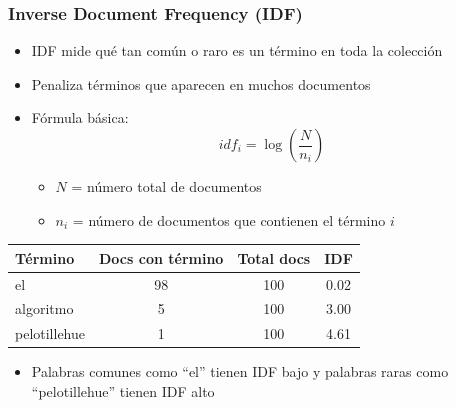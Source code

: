 \documentclass[handout]{beamer}
\begin{document}
\begin{frame}\frametitle{Inverse Document Frequency (IDF)}
\begin{itemize}
    \item IDF mide qué tan común o raro es un término en toda la colección
    \item Penaliza términos que aparecen en muchos documentos
    \item Fórmula básica:
    \[ idf_i = \log\left(\frac{N}{n_i}\right) \]
    \begin{itemize}
        \item $N$ = número total de documentos
        \item $n_i$ = número de documentos que contienen el término $i$
    \end{itemize}
\end{itemize}

\begin{table}[h]
  \small
  \centering
\begin{tabular}{|l|c|c|c|}
\hline
\textbf{Término} & \textbf{Docs con término} & \textbf{Total docs} & \textbf{IDF} \\
\hline
el & 98 & 100 & 0.02 \\
algoritmo & 5 & 100 & 3.00 \\
pelotillehue & 1 & 100 & 4.61 \\
\hline
\end{tabular}
\end{table}

\begin{itemize}
    \item Palabras comunes como ``el'' tienen IDF bajo y palabras raras como ``pelotillehue'' tienen IDF alto
\end{itemize}
\end{frame}
\end{document}
